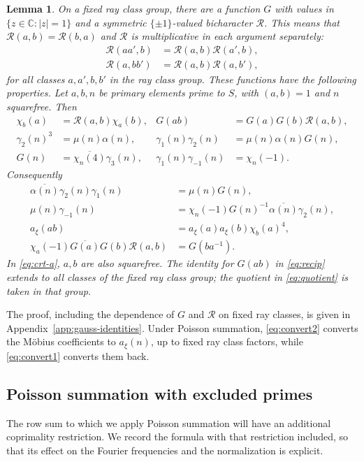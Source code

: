 \documentclass[11pt,a4paper]{article}
\numberwithin{equation}{section}
\numberwithin{figure}{section}
\newtheorem{lemma}[theorem]{Lemma}
\theoremstyle{definition}
\theoremstyle{remark}
\begin{document}
\begin{lemma}\label{lem:arithmetic}
On a fixed ray class group, there are a function $G$ with values in
$\{z\in\mathbb C:|z|=1\}$ and a symmetric $\{\pm1\}$-valued
bicharacter $\mathcal R$. This means that $\mathcal R(a,b)=\mathcal R(b,a)$ and $\mathcal R$ is
multiplicative in each argument separately:
\[
 \begin{aligned}
 \mathcal R(aa',b)&=\mathcal R(a,b)\mathcal R(a',b),\\
 \mathcal R(a,bb')&=\mathcal R(a,b)\mathcal R(a,b'),
 \end{aligned}
\]
for all classes $a,a',b,b'$ in the ray class group.
These functions have the following properties.
Let $a,b,n$ be primary elements prime to $S$, with $(a,b)=1$ and
$n$ squarefree. Then
\begin{align}
 \chi_b(a)&=\mathcal R(a,b)\chi_a(b),&
 G(ab)&=G(a)G(b)\mathcal R(a,b),                                      \label{eq:recip}\\
 \gamma_2(n)^3&=\mu(n)\alpha(n),&
 \gamma_1(n)\gamma_2(n)&=\mu(n)\alpha(n)G(n),                 \label{eq:gj}\\
 G(n)&=\overline{\chi_n(4)}\gamma_3(n),&
 \gamma_1(n)\gamma_{-1}(n)&=\chi_n(-1).                     \label{eq:g}
\end{align}
Consequently
\begin{align}
 \overline{\alpha(n)}\gamma_2(n)\gamma_1(n)&=\mu(n)G(n),\label{eq:convert1}\\
 \mu(n)\gamma_{-1}(n)
 &=\chi_n(-1)G(n)^{-1}\overline{\alpha(n)}\gamma_2(n),\label{eq:convert2}\\
 a_\xi(ab)&=a_\xi(a)a_\xi(b)\chi_b(a)^4,                     \label{eq:crt-a}\\
 \chi_a(-1)\overline{G(a)}G(b)\mathcal R(a,b)&=G(ba^{-1}).            \label{eq:quotient}
\end{align}
In \eqref{eq:crt-a}, $a,b$ are also squarefree.
The identity for $G(ab)$ in \eqref{eq:recip} extends to all classes of the fixed ray class
group; the quotient in \eqref{eq:quotient} is taken in that group.
\end{lemma}
The proof, including the dependence of $G$ and $\mathcal R$ on fixed ray
classes, is given in Appendix~\ref{app:gauss-identities}.
Under Poisson summation, \eqref{eq:convert2} converts the M\"obius
coefficients to $a_\xi(n)$, up to fixed ray class factors, while
\eqref{eq:convert1} converts them back.

\subsection{Poisson summation with excluded primes}
The row sum to which we apply Poisson summation will have an
additional coprimality restriction. We record the formula with that
restriction included, so that its effect on the Fourier frequencies
and the normalization is explicit.
\end{document}
